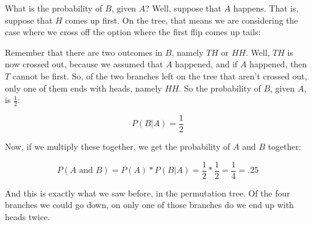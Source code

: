 \documentclass[../../../main.tex]{subfiles}
\begin{document}
\noindent
What is the probability of $B$, given $A$? Well, suppose that $A$ happens. That is, suppose that $H$ comes up first. On the tree, that means we are considering the case where we cross off the option where the first flip comes up tails:

\begin{center}
\end{center}

\noindent
Remember that there are two outcomes in $B$, namely $TH$ or $HH$. Well, $TH$ is now crossed out, because we assumed that $A$ happened, and if $A$ happened, then $T$ cannot be first. So, of the two branches left on the tree that aren't crossed out, only one of them ends with heads, namely $HH$. So the probability of $B$, given $A$, is $\frac{1}{2}$:

\begin{equation*}
  P(B | A) = \frac{1}{2}
\end{equation*}

\noindent
Now, if we multiply these together, we get the probability of $A$ and $B$ together:

\begin{equation*}
  P(A \text{ and } B) = P(A) * P(B | A) = \frac{1}{2} * \frac{1}{2} = \frac{1}{4} = .25
\end{equation*}

\noindent
And this is exactly what we saw before, in the permutation tree. Of the four branches we could go down, on only one of those branches do we end up with heads twice.
\end{document}
